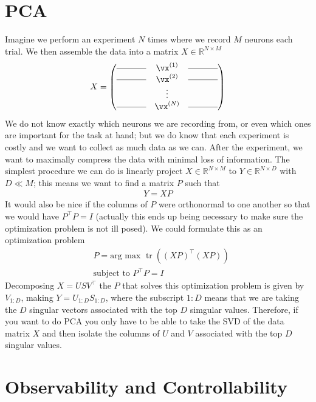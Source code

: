 \documentclass[a4paper,11pt]{exam}
\newcounter{ct}
\newcommand{\field}[1]{\ensuremath{\mathbb{#1}}}
\newcommand{\reals}{\field{R}}
\DeclareMathOperator*{\tr}{tr} %
\begin{document}
\section{PCA}
Imagine we perform an experiment $N$ times where we record $M$ neurons each trial.  We then assemble the data into a matrix $X \in \reals^{N \times M}$
\begin{align}
    X = \begin{pmatrix} 
        \rule[.5ex]{3.5em}{0.4pt} & \vx^{(1)} & \rule[.5ex]{3.5em}{0.4pt} \\
        \rule[.5ex]{3.5em}{0.4pt} & \vx^{(2)} & \rule[.5ex]{3.5em}{0.4pt} \\
         & \vdots & \\
         \rule[.5ex]{3.5em}{0.4pt} & \vx^{(N)} & \rule[.5ex]{3.5em}{0.4pt}
     \end{pmatrix}
\end{align}
We do not know exactly which neurons we are recording from, or even which ones are important for the task at hand; but we do know that each experiment is costly and we want to collect as much data as we can.  After the experiment, we want to maximally compress the data with minimal loss of information.  The simplest procedure we can do is linearly project $X \in \reals^{N \times M}$ to $Y \in \reals^{N \times D}$ with $D \ll M$; this means we want to find a matrix $P$ such that
\begin{align}
    Y = X P
\end{align}
It would also be nice if the columns of $P$ were orthonormal to one another so that we would have $P^\top P = I$ (actually this ends up being necessary to make sure the optimization problem is not ill posed). We could formulate this as an optimization problem
\begin{align}
    &P = \text{arg max } \tr((XP)^\top (XP))\\
    &\text{subject to } P^\top P = I
\end{align}
Decomposing $X=USV^\top$ the $P$ that solves this optimization problem is given by $V_{1:D}$, making $Y=U_{1:D} S_{1:D}$, where the subscript $1:D$ means that we are taking the $D$ singular vectors associated with the top $D$ simgular values.  Therefore, if you want to do PCA you only have to be able to take the SVD of the data matrix $X$ and then isolate the columns of $U$ and $V$ associated with the top $D$ singular values.

\section{Observability and Controllability}
\end{document}
